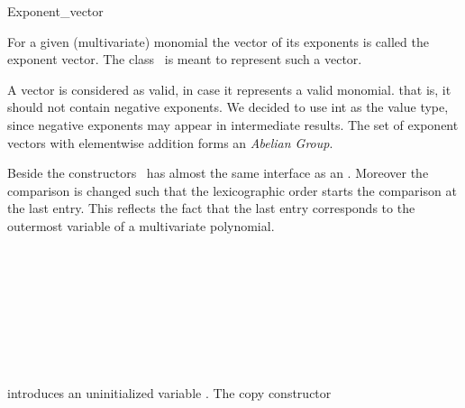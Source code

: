 \begin{ccRefClass}{Exponent_vector}

\ccDefinition

For a given (multivariate) monomial the vector of its exponents is called the 
exponent vector. The class \ccClassName\ is meant to represent 
such a vector.

A vector is considered as valid, in case it represents a valid monomial. 
that is, it should not contain negative exponents. 
We decided to use int as the value type, 
since negative exponents may appear in intermediate results.
The set of exponent vectors with elementwise 
addition forms an {\em Abelian Group}. 

Beside the constructors \ccClassName\ has almost the same interface as an  
. Moreover the comparison is changed such that 
the lexicographic order starts the comparison at the last entry.  
This reflects the fact that the last entry corresponds to the 
outermost variable of a multivariate polynomial. 




\ccIsModel

\\
\\

\\
\\
\\

\\
\\

\ccCreation
{}

        {introduces an uninitialized variable \ccVar.
        }\ccGlue
        {The copy constructor
        }\ccGlue


\end{ccRefClass}
